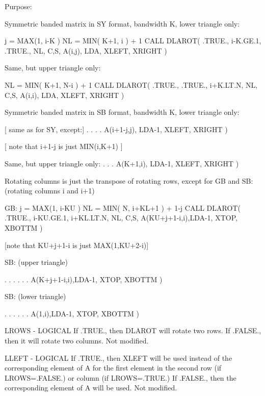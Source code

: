 \begin{DoxyParagraph}{Purpose\+: }
\begin{DoxyVerb}

      Symmetric banded matrix in SY format, bandwidth K,
      lower triangle only:

              j = MAX(1, i-K )
              NL = MIN( K+1, i ) + 1
              CALL DLAROT( .TRUE., i-K.GE.1, .TRUE., NL, C,S,
                      A(i,j), LDA, XLEFT, XRIGHT )

      Same, but upper triangle only:

              NL = MIN( K+1, N-i ) + 1
              CALL DLAROT( .TRUE., .TRUE., i+K.LT.N, NL, C,S,
                      A(i,i), LDA, XLEFT, XRIGHT )

      Symmetric banded matrix in SB format, bandwidth K,
      lower triangle only:

              [ same as for SY, except:]
                  . . . .
                      A(i+1-j,j), LDA-1, XLEFT, XRIGHT )

              [ note that i+1-j is just MIN(i,K+1) ]

      Same, but upper triangle only:
                   . . .
                      A(K+1,i), LDA-1, XLEFT, XRIGHT )

      Rotating columns is just the transpose of rotating rows, except
      for GB and SB: (rotating columns i and i+1)

      GB:
              j = MAX(1, i-KU )
              NL = MIN( N, i+KL+1 ) + 1-j
              CALL DLAROT( .TRUE., i-KU.GE.1, i+KL.LT.N, NL, C,S,
                      A(KU+j+1-i,i),LDA-1, XTOP, XBOTTM )

              [note that KU+j+1-i is just MAX(1,KU+2-i)]

      SB: (upper triangle)

                   . . . . . .
                      A(K+j+1-i,i),LDA-1, XTOP, XBOTTM )

      SB: (lower triangle)

                   . . . . . .
                      A(1,i),LDA-1, XTOP, XBOTTM )\end{DoxyVerb}
 \begin{DoxyVerb}  LROWS  - LOGICAL
           If .TRUE., then DLAROT will rotate two rows.  If .FALSE.,
           then it will rotate two columns.
           Not modified.

  LLEFT  - LOGICAL
           If .TRUE., then XLEFT will be used instead of the
           corresponding element of A for the first element in the
           second row (if LROWS=.FALSE.) or column (if LROWS=.TRUE.)
           If .FALSE., then the corresponding element of A will be
           used.
           Not modified.


\end{DoxyVerb}
\end{DoxyParagraph}
